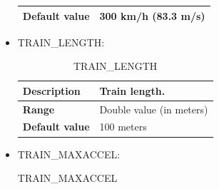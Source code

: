 \documentclass{template/openetcs}
\begin{document}
\begin{itemize}
\begin{longtable}{|l|l|}
				\hline
				
					\begin{minipage}[t]{0.22\linewidth} \textbf{Default value}	\end{minipage} 
				&	\begin{minipage}[t]{0.78\linewidth} 300 km/h (83.3 m/s) \end{minipage} \\
				
				\hline
				
			\end{longtable}
			
		\item TRAIN\_LENGTH:
																									
			\begin{longtable}{|l|l|}
				\caption{TRAIN\_LENGTH}\\ 
				\hline
				
					\begin{minipage}[t]{0.22\linewidth} \textbf{Description}	\end{minipage} 
				&	\begin{minipage}[t]{0.78\linewidth} Train length. \end{minipage} \\
				
				\hline
																																									
					\begin{minipage}[t]{0.22\linewidth} \textbf{Range}	\end{minipage} 
				&	\begin{minipage}[t]{0.78\linewidth} Double value (in meters) \end{minipage} \\
				
				\hline
				
					\begin{minipage}[t]{0.22\linewidth} \textbf{Default value}	\end{minipage} 
				&	\begin{minipage}[t]{0.78\linewidth} 100 meters \end{minipage} \\
				
				\hline
				
			\end{longtable}
			
		\item TRAIN\_MAXACCEL:
																											
			\begin{longtable}{|l|l|}
				\caption{TRAIN\_MAXACCEL}\\ 
				\hline
				

\end{longtable}
\end{itemize}
\end{document}
